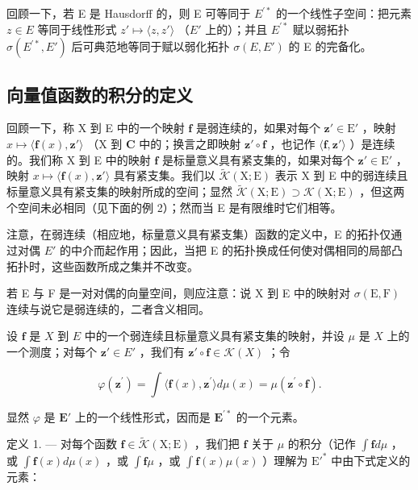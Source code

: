 回顾一下，若 E 是 Hausdorff 的，则 E 可等同于 \(E^{\prime*}\) 的一个线性子空间：把元素 \(z \in E\) 等同于线性形式 \(z' \mapsto \langle z, z' \rangle\) （\(E'\) 上的）；并且 \(E^{\prime*}\) 赋以弱拓扑 \(\sigma(E^{\prime*}, E')\) 后可典范地等同于赋以弱化拓扑 \(\sigma(E, E')\) 的 E 的完备化。

\subsection{向量值函数的积分的定义}

回顾一下，称 X 到 E 中的一个映射 \(\mathbf{f}\) 是弱连续的，如果对每个 \(\mathbf{z}' \in \mathrm{E}'\) ，映射 \(x \mapsto \langle \mathbf{f}(x), \mathbf{z}' \rangle\) （X 到 \(\mathbf{C}\) 中的；换言之即映射 \(\mathbf{z}' \circ \mathbf{f}\) ，也记作 \(\langle \mathbf{f}, \mathbf{z}' \rangle\) ）是连续的。我们称 X 到 E 中的映射 \(\mathbf{f}\) 是标量意义具有紧支集的，如果对每个 \(\mathbf{z}' \in \mathrm{E}'\) ，映射 \(x \mapsto \langle \mathbf{f}(x), \mathbf{z}' \rangle\) 具有紧支集。我们以 \(\widetilde{\mathcal{K}}(\mathrm{X};\mathrm{E})\) 表示 X 到 E 中的弱连续且标量意义具有紧支集的映射所成的空间；显然 \(\widetilde{\mathcal{K}}(\mathrm{X};\mathrm{E}) \supset \mathcal{K}(\mathrm{X};\mathrm{E})\) ，但这两个空间未必相同（见下面的例 2）；然而当 E 是有限维时它们相等。

注意，在弱连续（相应地，标量意义具有紧支集）函数的定义中，E 的拓扑仅通过对偶 \(E'\) 的中介而起作用；因此，当把 E 的拓扑换成任何使对偶相同的局部凸拓扑时，这些函数所成之集并不改变。

若 E 与 F 是一对对偶的向量空间，则应注意：说 X 到 E 中的映射对 \(\sigma(\mathrm{E},\mathrm{F})\) 连续与说它是弱连续的，二者含义相同。

设 \(\mathbf{f}\) 是 \(X\) 到 \(E\) 中的一个弱连续且标量意义具有紧支集的映射，并设 \(\mu\) 是 \(X\) 上的一个测度；对每个 \(\mathbf{z}' \in E'\) ，我们有 \(\mathbf{z}' \circ \mathbf{f} \in \mathcal{K}(X)\) ；令

\[
\varphi (\mathbf {z} ^ {\prime}) = \int \langle \mathbf {f} (x), \mathbf {z} ^ {\prime} \rangle d \mu (x) = \mu (\mathbf {z} ^ {\prime} \circ \mathbf {f}).
\]

显然 \(\varphi\) 是 \(\mathbf{E}'\) 上的一个线性形式，因而是 \(\mathbf{E}^{\prime*}\) 的一个元素。

定义 1. --- 对每个函数 \(\mathbf{f} \in \widetilde{\mathcal{K}}(\mathrm{X};\mathrm{E})\) ，我们把 \(\mathbf{f}\) 关于 \(\mu\) 的积分（记作 \(\int \mathbf{f} d\mu\) ，或 \(\int \mathbf{f}(x) d\mu(x)\) ，或 \(\int \mathbf{f}\mu\) ，或 \(\int \mathbf{f}(x)\mu(x)\) ）理解为 \(\mathrm{E}'^*\) 中由下式定义的元素：

